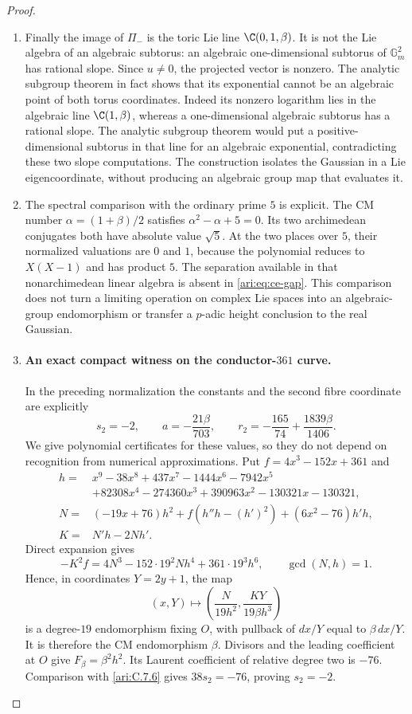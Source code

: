 \begin{proof}
\begin{enumerate}[label=\arabic*.,leftmargin=*]
\item Finally the image of $\Pi_-$ is the toric Lie line
$\C(0,1,\beta)$. It is not the Lie algebra of an algebraic
subtorus: an algebraic one-dimensional subtorus of
$\mathbb G_m^2$ has rational slope. Since $u\ne0$,
the projected vector is nonzero. The analytic subgroup
theorem in fact shows that its exponential cannot be an
algebraic point of both torus coordinates. Indeed its nonzero logarithm lies in the algebraic line
$\C(1,\beta)$, whereas a one-dimensional algebraic subtorus
has a rational slope. The analytic subgroup theorem would put
a positive-dimensional subtorus in that line for an algebraic
exponential, contradicting these two slope computations. The construction isolates the Gaussian in
a Lie eigencoordinate, without producing an algebraic
group map that evaluates it.

\item The spectral comparison with the ordinary prime $5$ is
explicit. The CM number $\alpha=(1+\beta)/2$ satisfies
$\alpha^2-\alpha+5=0$. Its two archimedean conjugates
both have absolute value $\sqrt5$. At the two places over
$5$, their normalized valuations are $0$ and $1$, because
the polynomial reduces to $X(X-1)$ and has product $5$.
The separation available in that nonarchimedean linear
algebra is absent in \eqref{ari:eq:ce-gap}. This comparison
does not turn a limiting operation on complex Lie spaces
into an algebraic-group endomorphism or transfer a
$p$-adic height conclusion to the real Gaussian.

\item \paragraph{An exact compact witness on the conductor-$361$ curve.}
In the preceding normalization the constants and the second
fibre coordinate are explicitly
\begin{equation}\label{ari:eq:ce-explicit-witness}
 s_2=-2,\qquad a=-\frac{21\beta}{703},\qquad
 r_2=-\frac{165}{74}+\frac{1839\beta}{1406}.
\end{equation}
We give polynomial certificates for these values, so they
do not depend on recognition from numerical approximations.
Put $f=4x^3-152x+361$ and
\[
 \begin{aligned}
 h={}&x^9-38x^8+437x^7-1444x^6-7942x^5\\
     &+82308x^4-274360x^3+390963x^2-130321x-130321,\\
 N={}&(-19x+76)h^2+f(h''h-(h')^2)+(6x^2-76)h'h,\\
 K={}&N'h-2Nh'.
 \end{aligned}
\]
Direct expansion gives
\[
 -K^2f=4N^3-152\cdot19^2Nh^4+361\cdot19^3h^6,
 \qquad \gcd(N,h)=1.
\]
Hence, in coordinates $Y=2y+1$, the map
\[
 (x,Y)\longmapsto
 \left(\frac{N}{19h^2},\frac{KY}{19\beta h^3}\right)
\]
is a degree-$19$ endomorphism fixing $O$, with pullback of
$dx/Y$ equal to $\beta\,dx/Y$. It is therefore the CM
endomorphism $\beta$. Divisors and the leading coefficient
at $O$ give $F_\beta=\beta^2h^2$. Its Laurent coefficient
of relative degree two is $-76$. Comparison with \ref{ari:C.7.6}
gives $38s_2=-76$, proving $s_2=-2$.


\end{enumerate}
\end{proof}
